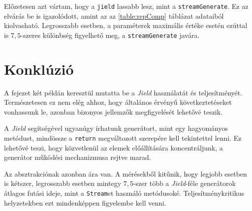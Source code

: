 Előzetesen azt vártam, hogy a \texttt{jield} lassabb lesz, mint a \texttt{streamGenerate}. Ez az elvárás be is igazolódott, amint az az \ref{table:repComp} táblázat adataiból kiolvasható. Legrosszabb esetben, a paraméterek maximális értéke esetén ezúttal is $7,5$-szeres különbség figyelhető meg, a \texttt{streamGenerate} javára. 

\section{Konklúzió}

A fejezet két példán keresztül mutatta be a \textit{Jield} használatát és teljesítményét. Természetesen ez nem elég ahhoz, hogy általános érvényű következtetéseket vonhassunk le, azonban bizonyos jellemzők megfigyelését lehetővé teszik.

A \textit{Jield} segítségével ugyanúgy írhatunk generátort, mint egy hagyományos metódust, mindössze a \texttt{return} megváltozott szerepére kell tekintettel lenni. Ez lehetővé teszi, hogy közvetlenül az elemek előállítására koncentráljunk, a generátor működési mechanizmusa rejtve marad.

Az absztrakciónak azonban ára van. A mérésekből kitűnik, hogy legjobb esetben is kétszer, legrosszabb esetben mintegy $7,5$-szer több a \textit{Jield}-féle generátorok átlagos futási ideje, mint a \texttt{Stream}et használó metódusoké. Teljesítménykritikus helyzetekben ezt mindenképpen figyelembe kell venni.
